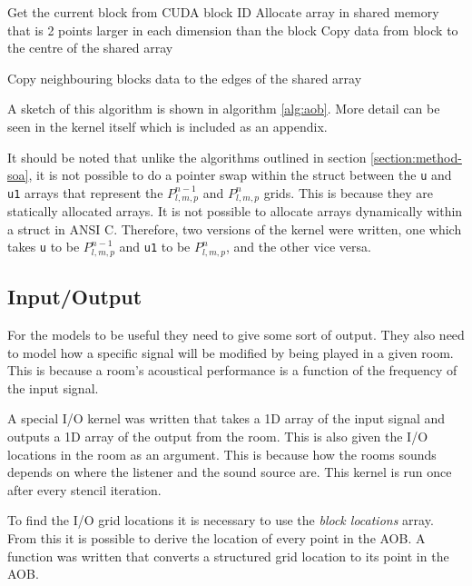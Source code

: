 \documentclass[12pt,a4paper]{report}
\begin{document}
\begin{algorithm}[H]
 Get the current block from CUDA block ID\;
 Allocate array in shared memory that is 2 points larger in each dimension than the block\; 
 Copy data from block to the centre of the shared array\;
 
 Copy neighbouring blocks data to the edges of the shared array\;
 
 \caption{CUDA kernel for update on an array of blocks.}
 \label{alg:aob}
\end{algorithm}

A sketch of this algorithm is shown in algorithm \ref{alg:aob}. More detail can be seen in the kernel itself which is included as an appendix.

It should be noted that unlike the algorithms outlined in section \ref{section:method-soa}, it is not possible to do a pointer swap within the struct between the \lstinline|u| and \lstinline|u1| arrays that represent the  $P_{l,m,p}^{n-1}$ and $P_{l,m,p}^{n}$ grids. This is because they are statically allocated arrays. It is not possible to allocate arrays dynamically within a struct in ANSI C. Therefore, two versions of the kernel were written, one which takes \lstinline|u| to be $P_{l,m,p}^{n-1}$ and \lstinline|u1| to be $P_{l,m,p}^{n}$, and the other vice versa.

\subsection{Input/Output}

For the models to be useful they need to give some sort of output. They also need to model how a specific signal will be modified by being played in a given room. This is because a room's acoustical performance is a function of the frequency of the input signal. 

A special I/O kernel was written that takes a 1D array of the input signal and outputs a 1D array of the output from the room. This is also given the I/O locations in the room as an argument. This is because how the rooms sounds depends on where the listener and the sound source are. This kernel is run once after every stencil iteration.

To find the I/O grid locations it is necessary to use the \textit{block locations} array. From this it is possible to derive the location of every point in the AOB. A function was written that converts a structured grid location to its point in the AOB.
\end{document}
